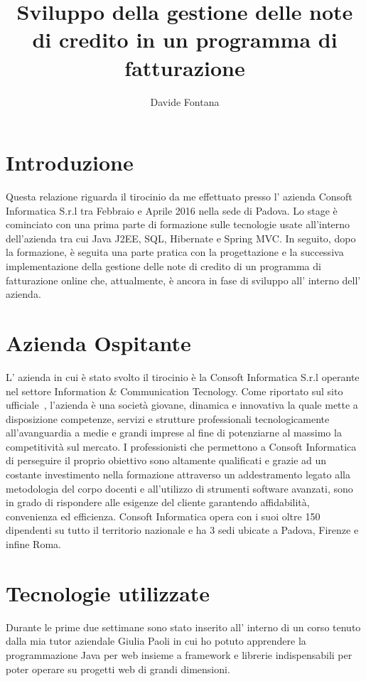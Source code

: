 \documentclass[12pt]{book}
\title{Sviluppo della gestione delle note di credito in un programma di fatturazione}
\author{Davide Fontana}
\begin{document}
\maketitle
\tableofcontents
\chapter{Introduzione}
Questa relazione riguarda il tirocinio da me effettuato presso l' azienda 
Consoft Informatica S.r.l tra Febbraio e Aprile 2016 nella sede di Padova.
Lo stage è cominciato con una prima parte di formazione sulle tecnologie usate 
all'interno dell'azienda tra cui Java J2EE, SQL, Hibernate e Spring MVC\@.
In seguito, dopo la formazione, è seguita una parte pratica con la progettazione
e la successiva implementazione della gestione delle note di credito di un 
programma di fatturazione online che, attualmente, è ancora in fase di sviluppo
all' interno dell' azienda.
\chapter{Azienda Ospitante}
L' azienda in cui è stato svolto il tirocinio è la Consoft Informatica S.r.l
operante nel settore Information \& Communication Tecnology\@.
Come riportato sul sito ufficiale~\cite{consoft:descrizione}, l'azienda è una
società giovane, dinamica e innovativa la quale mette a disposizione competenze,
servizi e strutture professionali tecnologicamente all’avanguardia a medie e 
grandi imprese al fine di potenziarne al massimo la competitività sul mercato. 
I professionisti che permettono a Consoft Informatica di perseguire il 
proprio obiettivo sono altamente qualificati e grazie ad un costante 
investimento nella formazione attraverso un  addestramento legato alla 
metodologia del corpo docenti e all’utilizzo di strumenti software avanzati, 
sono in grado di rispondere alle esigenze del cliente garantendo affidabilità,
convenienza ed efficienza.
Consoft Informatica opera con i suoi oltre 150 dipendenti su tutto il territorio
nazionale e ha 3 sedi ubicate a Padova, Firenze e infine Roma. 
\chapter{Tecnologie utilizzate}
Durante le prime due settimane sono stato inserito all' interno di un corso 
tenuto dalla mia tutor aziendale Giulia Paoli in cui ho potuto apprendere 
la programmazione Java per web insieme a framework e librerie indispensabili 
per poter operare su progetti web di grandi dimensioni.
\end{document}
